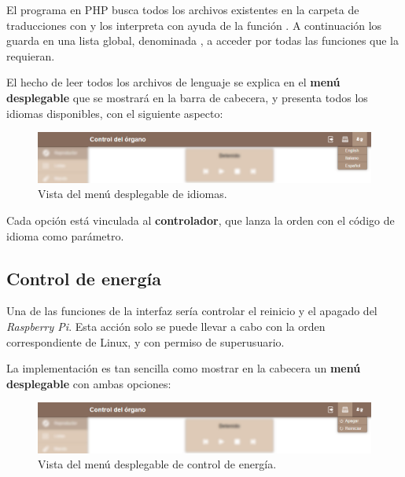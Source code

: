 El programa en \acrshort{PHP} busca todos los archivos existentes en la carpeta de traducciones con  y los interpreta con ayuda de la función . A continuación los guarda en una lista global, denominada , a acceder por todas las funciones que la requieran.

El hecho de leer todos los archivos de lenguaje se explica en el \textbf{menú desplegable} que se mostrará en la barra de cabecera, y presenta todos los idiomas disponibles, con el siguiente aspecto:

\smallskip

\begin{figure}[H]
	\noindent \begin{centering}
		\includegraphics[width=\linewidth*3/4]{capitulo5/cap_repr_idiomas}
		\par\end{centering}
	\smallskip
	\caption{\label{fig:cap_repr_idiomas} Vista del menú desplegable de idiomas.}
\end{figure} 

\smallskip

Cada opción está vinculada al \textbf{controlador}, que lanza la orden  con el código de idioma como parámetro.

\subsection{Control de energía}

Una de las funciones de la interfaz sería controlar el reinicio y el apagado del \textit{Raspberry Pi}. Esta acción solo se puede llevar a cabo con la orden correspondiente de Linux, y con permiso de superusuario.

La implementación es tan sencilla como mostrar en la cabecera un \textbf{menú desplegable} con ambas opciones:

\smallskip

\begin{figure}[H]
	\noindent \begin{centering}
		\includegraphics[width=\linewidth*3/4]{capitulo5/cap_repr_apagar}
		\par\end{centering}
	\smallskip
	\caption{\label{fig:cap_repr_apagar} Vista del menú desplegable de control de energía.}
\end{figure} 

